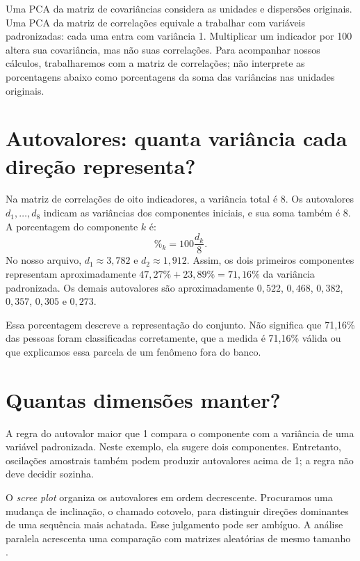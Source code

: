 Uma PCA da matriz de covariâncias considera as unidades e dispersões originais. Uma PCA da matriz de correlações equivale a trabalhar com variáveis padronizadas: cada uma entra com variância 1. Multiplicar um indicador por 100 altera sua covariância, mas não suas correlações. Para acompanhar nossos cálculos, trabalharemos com a matriz de correlações; não interprete as porcentagens abaixo como porcentagens da soma das variâncias nas unidades originais.

\section{Autovalores: quanta variância cada direção representa?}

Na matriz de correlações de oito indicadores, a variância total é 8. Os autovalores $d_1,\ldots,d_8$ indicam as variâncias dos componentes iniciais, e sua soma também é 8. A porcentagem do componente $k$ é:
\[
\%_k=100\frac{d_k}{8}.
\]
No nosso arquivo, $d_1\approx3{,}782$ e $d_2\approx1{,}912$. Assim, os dois primeiros componentes representam aproximadamente $47{,}27\%+23{,}89\%=71{,}16\%$ da variância padronizada. Os demais autovalores são aproximadamente $0{,}522$, $0{,}468$, $0{,}382$, $0{,}357$, $0{,}305$ e $0{,}273$.

Essa porcentagem descreve a representação do conjunto. Não significa que 71,16\% das pessoas foram classificadas corretamente, que a medida é 71,16\% válida ou que explicamos essa parcela de um fenômeno fora do banco.

\section{Quantas dimensões manter?}

A regra do autovalor maior que 1 compara o componente com a variância de uma variável padronizada. Neste exemplo, ela sugere dois componentes. Entretanto, oscilações amostrais também podem produzir autovalores acima de 1; a regra não deve decidir sozinha.

O \textit{scree plot} organiza os autovalores em ordem decrescente. Procuramos uma mudança de inclinação, o chamado cotovelo, para distinguir direções dominantes de uma sequência mais achatada. Esse julgamento pode ser ambíguo. A análise paralela acrescenta uma comparação com matrizes aleatórias de mesmo tamanho \parencite{RevelleParalela}.

